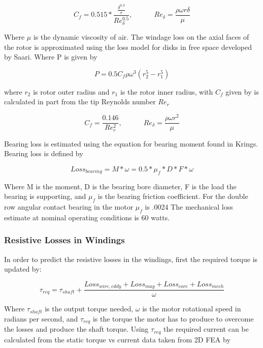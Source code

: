 \documentclass[]{aiaa-tc}%
\begin{document}
\begin{equation}
C_{f}= 0.515*\frac{\frac{\delta^{0.3}}{r}}{Re_{\delta}^{0.5}} , \quad \quad \quad Re_{\delta}=\frac{\rho\omega r \delta}{\mu}
\label{eq:Cf}
\end{equation}

Where $\mu$ is the dynamic viscosity of air. 
The windage loss on the axial faces of the rotor is approximated using the loss model for disks in free space developed by Saari.\cite{Saari} Where P is given by 

\begin{equation}
P =0.5C_{f}\rho\omega^{3}(r_{2}^{5}-r_{1}^{5})
\label{eq:AxialWindage}
\end{equation}

where $r_{2}$ is rotor outer radius and $r_{1}$ is the rotor inner radius, with $C_{f}$ given by is calculated in part from the tip Reynolds number $Re_{r}$

\begin{equation}
C_{f}= \frac{0.146}{Re_{r}^{2}}, \quad \quad \quad
Re_{\delta}=\frac{\rho\omega r^{2}}{\mu}
\label{eq:Cf2}
\end{equation}

Bearing loss is estimated using the equation for bearing moment found in Krings.\cite{Krings} Bearing loss is defined by

\begin{equation}
Loss_{bearing} = M*\omega = 0.5*\mu_{f}*D*F*\omega
\label{eq:BearingLoss}
\end{equation}

Where M is the moment, D is the bearing bore diameter, F is the load the bearing is supporting, and $\mu_{f}$ is the bearing friction coefficient. For the double row angular contact bearing in the motor $\mu_{f}$ is .0024  The mechanical loss estimate at nominal operating conditions is 60 watts.


\subsubsection{Resistive Losses in Windings}
In order to predict the resistive losses in the windings, first the required torque is updated by:

\begin{equation}
\tau_{req} = \tau_{shaft} + \frac{Loss_{wire,eddy} + Loss_{mag} +Loss_{core} +Loss_{mech}}{\omega}
\label{eq:TotalLoss}
\end{equation}

Where $\tau_{shaft}$ is the output torque needed, $\omega$ is the motor rotational speed in radians per second, and $\tau_{req}$ is the torque the motor has to produce to overcome the losses and produce the shaft torque. Using $\tau_{req}$ the required current can be calculated from the static torque vs current data taken from 2D FEA by
\end{document}

